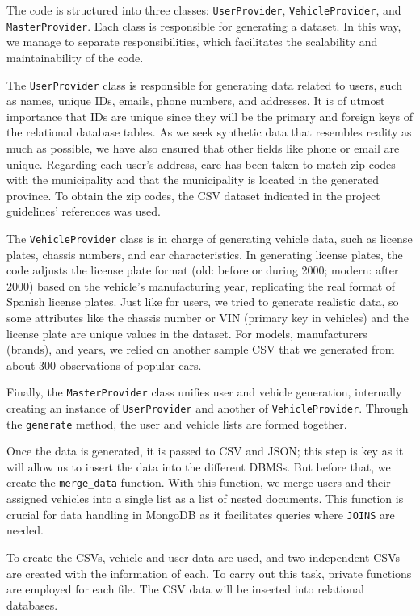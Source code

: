 \documentclass[11pt,a4paper]{article}
\begin{document}
The code is structured into three classes: \texttt{UserProvider}, \texttt{VehicleProvider}, and \texttt{MasterProvider}. Each class is responsible for generating a dataset. In this way, we manage to separate responsibilities, which facilitates the scalability and maintainability of the code.

The \texttt{UserProvider} class is responsible for generating data related to users, such as names, unique IDs, emails, phone numbers, and addresses. It is of utmost importance that IDs are unique since they will be the primary and foreign keys of the relational database tables. As we seek synthetic data that resembles reality as much as possible, we have also ensured that other fields like phone or email are unique. Regarding each user's address, care has been taken to match zip codes with the municipality and that the municipality is located in the generated province. To obtain the zip codes, the CSV dataset indicated in the project guidelines' references was used.

The \texttt{VehicleProvider} class is in charge of generating vehicle data, such as license plates, chassis numbers, and car characteristics. In generating license plates, the code adjusts the license plate format (old: before or during 2000; modern: after 2000) based on the vehicle's manufacturing year, replicating the real format of Spanish license plates. Just like for users, we tried to generate realistic data, so some attributes like the chassis number or VIN (primary key in vehicles) and the license plate are unique values in the dataset. For models, manufacturers (brands), and years, we relied on another sample CSV that we generated from about 300 observations of popular cars.

Finally, the \texttt{MasterProvider} class unifies user and vehicle generation, internally creating an instance of \texttt{UserProvider} and another of \texttt{VehicleProvider}. Through the \texttt{generate} method, the user and vehicle lists are formed together.

Once the data is generated, it is passed to CSV and JSON; this step is key as it will allow us to insert the data into the different DBMSs. But before that, we create the \texttt{merge\_data} function. With this function, we merge users and their assigned vehicles into a single list as a list of nested documents. This function is crucial for data handling in MongoDB as it facilitates queries where \texttt{JOINS} are needed.

To create the CSVs, vehicle and user data are used, and two independent CSVs are created with the information of each. To carry out this task, private functions are employed for each file. The CSV data will be inserted into relational databases.
\end{document}
